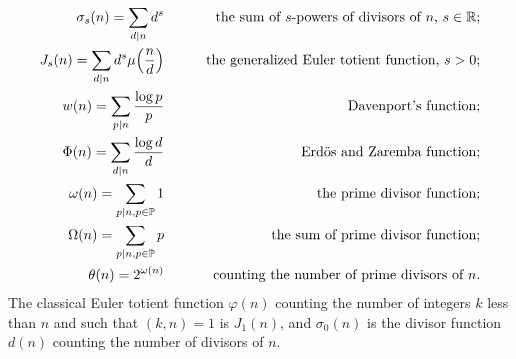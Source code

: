 \documentclass[11pt,draft,reqno]{amsart}
\theoremstyle{definition}
\theoremstyle{remarks}
\numberwithin{equation}{section}
\def \g{{\gamma}}
\def \o{{\omega}}
\def \p{{\varphi}}
\def \m{{\mu}}
\def \s{{\sigma}}
\def \qq{{\qquad}}
\def\P{{\mathcal P}}
\def\P{{\mathbb P}}
\def\R{{\mathbb R}}
\begin{document}
  \begin{eqnarray*}
    \s_s(n) = \sum_{d|n} d^s &&\qq\hbox{\rm the sum of $s$-powers of divisors of $n$, $s\in \R$;}
  \cr   J_s(n)=\sum_{d|n} d^s \m\Big(\frac{n}{d} \Big) &&\qq\hbox{\rm the generalized Euler totient function, $s>0$;}
\cr    w(n)=\sum_{p|n}\frac{\log p}{p} &&\qq\hbox{\rm Davenport's function;}
\cr \Phi(n)=\sum_{d|n} \frac{\log d}{d} &&\qq\hbox{\rm Erd\"os and  Zaremba function;}
\cr 
 \omega(n) = \sum_{p|n,p\in \P} 1 &&\qq\hbox{\rm the prime divisor function;}
   \cr  \Omega(n) = \sum_{p|n,p\in \P} p &&\qq\hbox{\rm   the sum of  prime divisor function;}
 \cr\theta(n)= 2^{\o(n)} &&\qq\hbox{\rm    counting the number of prime divisors of  $n$.}\end{eqnarray*}   
   The classical Euler totient function $\p(n)$ counting the number of integers $k $ less than $n$ and such that $(k,n) =1$ is $J_1(n)$, and $\s_0(n)$ is the divisor function $d(n)$ counting the number of divisors of $n$. 
 
\end{document}
